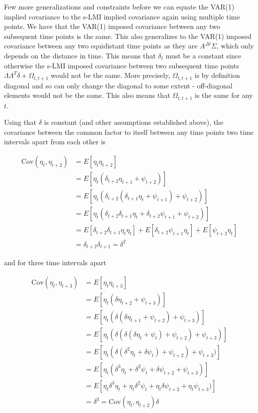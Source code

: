 \documentclass[
  letterpaper,
  DIV=11,
  numbers=noendperiod]{scrartcl}
\begin{document}
Few more generalizations and constraints before we can equate the VAR(1)
implied covariance to the s-LMI implied covariance again using multiple
time points. We have that the VAR(1) imposed covariance between any two
subsequent time points is the same. This also generalizes to the VAR(1)
imposed covariance between any two equidistant time points as they are
\(A^{\Delta t}\Sigma\), which only depends on the distance in time. This
means that \(\delta_t\) must be a constant since otherwise the s-LMI
imposed covariance between two subsequent time points
\(\Lambda\Lambda^T\delta + \Omega_{t,t+1}\) would not be the same. More
precisely, \(\Omega_{t,t+1}\) is by definition diagonal and so can only
change the diagonal to some extent - off-diagonal elements would not be
the same. This also means that \(\Omega_{t,t+1}\) is the same for any
\(t\).

Using that \(\delta\) is constant (and other assumptions established
above), the covariance between the common factor to itself between any
time points two time intervals apart from each other is

\[
\begin{align*}
\text{Cov}(\eta_t,\eta_{t+2})&=E[\eta_{t}\eta_{t+2}]\\
&=E[\eta_{t}  (\delta_{t+2}\eta_{t+1}+\psi_{t+2})  ]\\
&=E[\eta_{t}  (\delta_{t+2}(\delta_{t+1}\eta_{t}+\psi_{t+1})+\psi_{t+2})  ]\\
&=E[\eta_{t}  (\delta_{t+2}\delta_{t+1}\eta_{t}+\delta_{t+2}\psi_{t+1}+\psi_{t+2})  ]\\
&=E[\delta_{t+2}\delta_{t+1}\eta_{t}\eta_{t}]+E[\delta_{t+2}\psi_{t+1}\eta_{t}]+E[\psi_{t+2}\eta_{t}]\\
&=\delta_{t+2}\delta_{t+1}=\delta^2
\end{align*}
\]

and for three time intervals apart

\[
\begin{align*}
\text{Cov}(\eta_t,\eta_{t+3})&=E[\eta_{t}\eta_{t+3}]\\
&=E[\eta_{t}  (\delta\eta_{t+2}+\psi_{t+3})  ]\\
&=E[\eta_{t}  (\delta(\delta\eta_{t+1}+\psi_{t+2})+\psi_{t+3})  ]\\
&=E[\eta_{t}  (\delta(\delta(\delta\eta_{t}+\psi_t)+\psi_{t+2})+\psi_{t+3})  ]\\
&=E[\eta_{t}  (\delta(\delta^2\eta_{t}+\delta\psi_t)+\psi_{t+2})+\psi_{t+3})  ]\\
&=E[\eta_{t}  (\delta^3\eta_{t}+\delta^2\psi_t+\delta\psi_{t+2}+\psi_{t+3})  ]\\
&=E[\eta_{t}\delta^3\eta_{t}+\eta_{t}\delta^2\psi_t+\eta_{t}\delta\psi_{t+2}+\eta_{t}\psi_{t+3})  ]\\
&=\delta^3=\text{Cov}(\eta_t,\eta_{t+2})\delta
\end{align*}
\]
\end{document}
